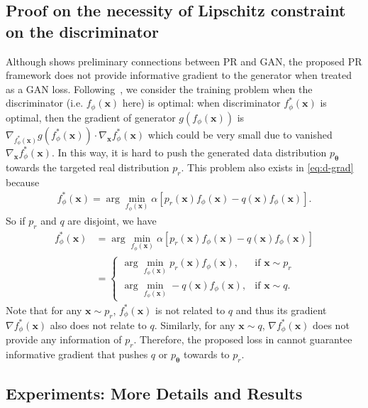\documentclass{article}
\newcommand{\0}{\bm{0}}
\newcommand{\wm}{\bm{\theta}}
\newcommand{\xm}{\bm{x}}
\begin{document}
\subsection{Proof on the necessity of Lipschitz constraint on the discriminator} \label{pf_issue}
Although \cite{hu2018deep} shows preliminary connections between PR and GAN, the proposed PR framework does not provide informative gradient to the generator when treated as a GAN loss. 
Following~\cite{zhou2018understanding}, we consider the training problem when the discriminator (i.e. $f_{\phi}(\xm)$ here) is optimal: when discriminator $f^*_{\phi}(\xm)$ is optimal, then the gradient of generator $g(f_{\phi}(\xm))$ is $\nabla_{f^*_{\phi}(\xm)} g(f^*_{\phi}(\xm)) \cdot \nabla_{\xm} f^*_{\phi}(\xm)$ which could be very small due to vanished $\nabla_{\xm} f^*_{\phi}(\xm)$. In this way, it is hard to push the generated data distribution $p_{\wm}$ towards the targeted real distribution $p_r$. This problem also exists in \eqref{eq:d-grad} because
\begin{equation}\begin{split}
f^*_{\phi}(\xm) =  \arg\min_{f_{\phi}(\xm)} \alpha \left[   p_r(\xm) f_{\phi}(\xm)  - q(\xm)    f_{\phi}(\xm) \right].
\end{split}
\end{equation}
So if $p_r$ and $q$ are disjoint, we have
\begin{equation}\begin{split}
f^*_{\phi}(\xm)& =  \arg\min_{f_{\phi}(\xm)} \alpha \left[   p_r(\xm) f_{\phi}(\xm)  - q(\xm)    f_{\phi}(\xm) \right]\\
&= \begin{cases}
                \arg\min_{f_{\phi}(\xm)} p_r(\xm) f_{\phi}(\xm), & \mbox{if } \xm\sim p_r \\
                \arg\min_{f_{\phi}(\xm)} - q(\xm)    f_{\phi}(\xm), & \mbox{if } \xm \sim q.
                 \end{cases}
\end{split}
\end{equation}
Note that for any $\xm\sim p_r$, $f^*_{\phi}(\xm)$ is not related to $q$ and thus its gradient $\nabla f^*_{\phi}(\xm)$ also does not relate to $q$. Similarly, for any $\xm\sim q$, $\nabla f^*_{\phi}(\xm)$ does not provide any information of  $p_r$. Therefore, the proposed loss in \cite{hu2018deep} cannot guarantee informative gradient \cite{zhou2018understanding} that pushes $q$ or $p_{\wm}$ towards to $p_r$. 

\subsection{Experiments: More Details and Results}
\end{document}
